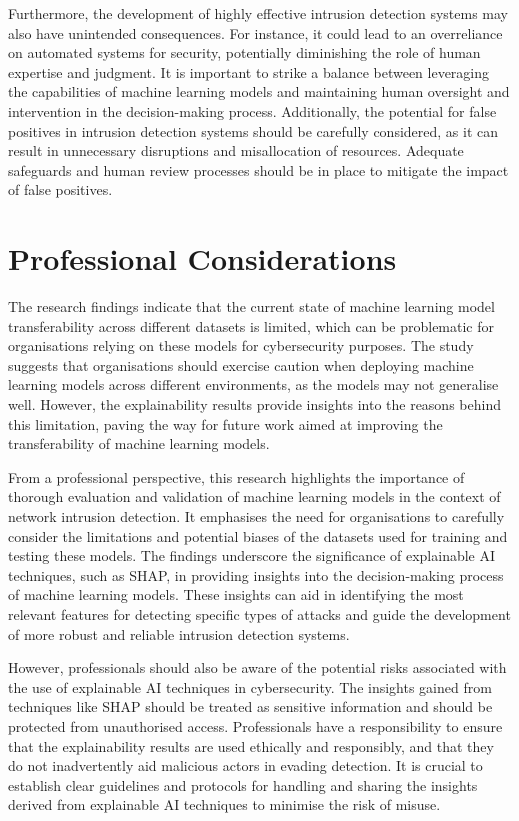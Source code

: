 Furthermore, the development of highly effective intrusion detection systems may also have unintended consequences. For instance, it could lead to an overreliance on automated systems for security, potentially diminishing the role of human expertise and judgment. It is important to strike a balance between leveraging the capabilities of machine learning models and maintaining human oversight and intervention in the decision-making process. Additionally, the potential for false positives in intrusion detection systems should be carefully considered, as it can result in unnecessary disruptions and misallocation of resources. Adequate safeguards and human review processes should be in place to mitigate the impact of false positives.

\section{Professional Considerations}
The research findings indicate that the current state of machine learning model transferability across different datasets is limited, which can be problematic for organisations relying on these models for cybersecurity purposes. The study suggests that organisations should exercise caution when deploying machine learning models across different environments, as the models may not generalise well. However, the explainability results provide insights into the reasons behind this limitation, paving the way for future work aimed at improving the transferability of machine learning models.

From a professional perspective, this research highlights the importance of thorough evaluation and validation of machine learning models in the context of network intrusion detection. It emphasises the need for organisations to carefully consider the limitations and potential biases of the datasets used for training and testing these models. The findings underscore the significance of explainable AI techniques, such as SHAP, in providing insights into the decision-making process of machine learning models. These insights can aid in identifying the most relevant features for detecting specific types of attacks and guide the development of more robust and reliable intrusion detection systems.

However, professionals should also be aware of the potential risks associated with the use of explainable AI techniques in cybersecurity. The insights gained from techniques like SHAP should be treated as sensitive information and should be protected from unauthorised access. Professionals have a responsibility to ensure that the explainability results are used ethically and responsibly, and that they do not inadvertently aid malicious actors in evading detection. It is crucial to establish clear guidelines and protocols for handling and sharing the insights derived from explainable AI techniques to minimise the risk of misuse.

